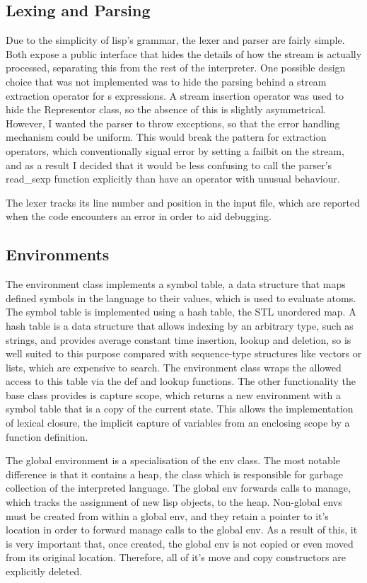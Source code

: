 \documentclass[12pt]{article}
\begin{document}
\subsection{Lexing and Parsing}
\label{section:parser}

Due to the simplicity of lisp's grammar, the lexer and parser are
fairly simple. Both expose a public interface that hides the details
of how the stream is actually processed, separating this from the rest
of the interpreter. One possible design choice that was not
implemented was to hide the parsing behind a stream extraction
operator for s expressions. A stream insertion operator was used to
hide the Representor class, so the absence of this is slightly
asymmetrical. However, I wanted the parser to throw exceptions, so
that the error handling mechanism could be uniform. This would break
the pattern for extraction operators, which conventionally signal
error by setting a failbit on the stream, and as a result I decided
that it would be less confusing to call the parser's read\_sexp
function explicitly than have an operator with unusual behaviour.

The lexer tracks its line number and position in the input file,
which are reported when the code encounters an error in order to aid
debugging.


\subsection{Environments}

The environment class implements a symbol table, a data structure that
maps defined symbols in the language to their values, which is used to
evaluate atoms. The symbol table is implemented using a hash table,
the STL unordered map. A hash table is a data structure that allows
indexing by an arbitrary type, such as strings, and provides average
constant time insertion, lookup and deletion, so is well suited to
this purpose compared with sequence-type structures like vectors or
lists, which are expensive to search. The environment class wraps the
allowed access to this table via the def and lookup functions. The
other functionality the base class provides is capture scope, which
returns a new environment with a symbol table that is a copy of the
current state. This allows the implementation of lexical closure, the
implicit capture of variables from an enclosing scope by a function 
definition.


The global environment is a specialisation of the env class. The most
notable difference is that it contains a heap, the class which is
responsible for garbage collection of the interpreted language. The
global env forwards calls to manage, which tracks the assignment of
new lisp objects, to the heap. Non-global envs must be created from
within a global env, and they retain a pointer to it's location in
order to forward manage calls to the global env. As a result of
this, it is very important that, once created, the global env is not
copied or even moved from its original location. Therefore, all of
it's move and copy constructors are explicitly deleted.
\end{document}
